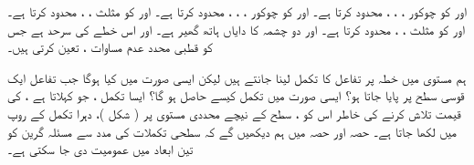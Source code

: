   اور  کو  چوکور   ، ، ،   محدود کرتا ہے۔
  اور کو  چوکور  ، ، ،  محدود کرتا ہے۔
   اور کو   مثلث   ، ،   محدود کرتا ہے۔
    اور کو   مثلث   ، ،   محدود کرتا ہے۔
 اور   دو چشمہ  کا دایاں ہاتھ گھیر ہے۔
 اور  اس خطے کی سرحد ہے جس کو قطبی محدد عدم مساوات ،   تعین کرتی  ہیں۔

ہم مستوی  میں   خطہ پر تفاعل کا تکمل لینا جانتے ہیں لیکن ایسی صورت میں کیا ہوگا جب تفاعل ایک قوسی سطح پر پایا جاتا ہو؟    ایسی صورت میں تکمل کیسے حاصل  ہو گا؟ ایسا تکمل  ، جو کہلاتا ہے ، کی قیمت تلاش کرنے کی خاطر      اس کو ، سطح کے نیچے محددی مستوی  پر   ( شکل  )، دہرا تکمل  کے روپ میں لکھا جاتا ہے۔ حصہ   اور حصہ  میں ہم دیکھیں گے کہ سطحی تکملات کی مدد سے مسئلہ گرین کو تین ابعاد میں عمومیت دی جا سکتی ہے۔ 


